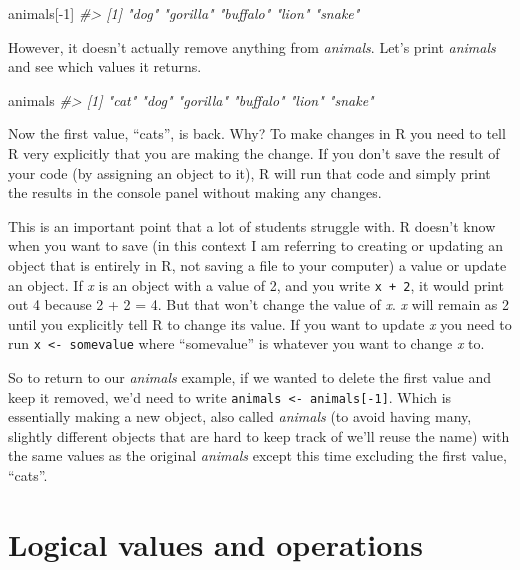 \documentclass[
]{krantz}
\makeatletter
\newenvironment{Shaded}{\begin{snugshade}}{\end{snugshade}}
\newcommand{\CommentTok}[1]{\textcolor[rgb]{0.37,0.37,0.37}{\textit{#1}}}
\newcommand{\DecValTok}[1]{\textcolor[rgb]{0.06,0.06,0.06}{#1}}
\newcommand{\NormalTok}[1]{#1}
\newcommand{\SpecialCharTok}[1]{\textcolor[rgb]{0,0,0}{#1}}
\newenvironment{kframe}{%
\medskip{}
\setlength{\fboxsep}{.8em}
 \def\at@end@of@kframe{}%
 \ifinner\ifhmode%
  \def\at@end@of@kframe{\end{minipage}}%
  \begin{minipage}{\columnwidth}%
 \fi\fi%
 \def\FrameCommand##1{\hskip\@totalleftmargin \hskip-\fboxsep
 \colorbox{shadecolor}{##1}\hskip-\fboxsep
     \hskip-\linewidth \hskip-\@totalleftmargin \hskip\columnwidth}%
 \MakeFramed {\advance\hsize-\width
   \@totalleftmargin\z@ \linewidth\hsize
   \@setminipage}}%
 {\par\unskip\endMakeFramed%
 \at@end@of@kframe}
\renewenvironment{Shaded}{\begin{kframe}}{\end{kframe}}
\makeatother
\begin{document}
\begin{Shaded}
\begin{Highlighting}[]
\NormalTok{animals[}\SpecialCharTok{{-}}\DecValTok{1}\NormalTok{]}
\CommentTok{\#\textgreater{} [1] "dog"     "gorilla" "buffalo" "lion"    "snake"}
\end{Highlighting}
\end{Shaded}

However, it doesn't actually remove anything from \emph{animals}. Let's print \emph{animals} and see which values it returns.

\begin{Shaded}
\begin{Highlighting}[]
\NormalTok{animals}
\CommentTok{\#\textgreater{} [1] "cat"     "dog"     "gorilla" "buffalo" "lion"    "snake"}
\end{Highlighting}
\end{Shaded}

Now the first value, ``cats'', is back. Why? To make changes in R you need to tell R very explicitly that you are making the change. If you don't save the result of your code (by assigning an object to it), R will run that code and simply print the results in the console panel without making any changes.

This is an important point that a lot of students struggle with. R doesn't know when you want to save (in this context I am referring to creating or updating an object that is entirely in R, not saving a file to your computer) a value or update an object. If \emph{x} is an object with a value of 2, and you write \texttt{x\ +\ 2}, it would print out 4 because 2 + 2 = 4. But that won't change the value of \emph{x}. \emph{x} will remain as 2 until you explicitly tell R to change its value. If you want to update \emph{x} you need to run \texttt{x\ \textless{}-\ somevalue} where ``somevalue'' is whatever you want to change \emph{x} to.

So to return to our \emph{animals} example, if we wanted to delete the first value and keep it removed, we'd need to write \texttt{animals\ \textless{}-\ animals{[}-1{]}}. Which is essentially making a new object, also called \emph{animals} (to avoid having many, slightly different objects that are hard to keep track of we'll reuse the name) with the same values as the original \emph{animals} except this time excluding the first value, ``cats''.

\hypertarget{logical-values-and-operations}{%
\section{Logical values and operations}\label{logical-values-and-operations}}
\end{document}
